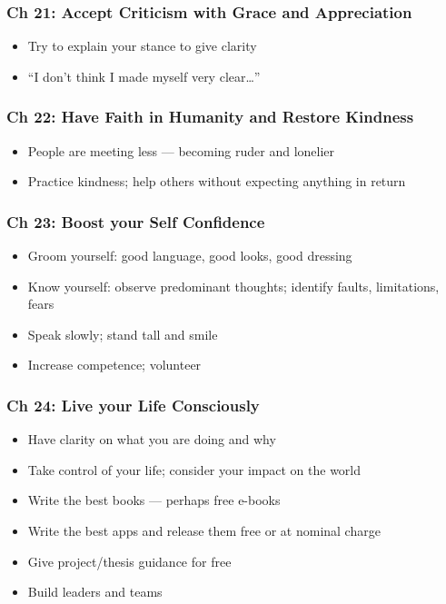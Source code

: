 \begin{frame}[fragile]
\frametitle{Ch 21: Accept Criticism with Grace and Appreciation}
\begin{itemize}
\item Try to explain your stance to give clarity
\item ``I don't think I made myself very clear\ldots''
\end{itemize}
\end{frame}

\begin{frame}[fragile]
\frametitle{Ch 22: Have Faith in Humanity and Restore Kindness}
\begin{itemize}
\item People are meeting less --- becoming ruder and lonelier
\item Practice kindness; help others without expecting anything in return
\end{itemize}
\end{frame}

\begin{frame}[fragile]
\frametitle{Ch 23: Boost your Self Confidence}
\begin{itemize}
\item Groom yourself: good language, good looks, good dressing
\item Know yourself: observe predominant thoughts; identify faults, limitations, fears
\item Speak slowly; stand tall and smile
\item Increase competence; volunteer
\end{itemize}
\end{frame}

\begin{frame}[fragile]
\frametitle{Ch 24: Live your Life Consciously}
\begin{itemize}
\item Have clarity on what you are doing and why
\item Take control of your life; consider your impact on the world
\item Write the best books --- perhaps free e-books
\item Write the best apps and release them free or at nominal charge
\item Give project/thesis guidance for free
\item Build leaders and teams
\end{itemize}
\end{frame}
